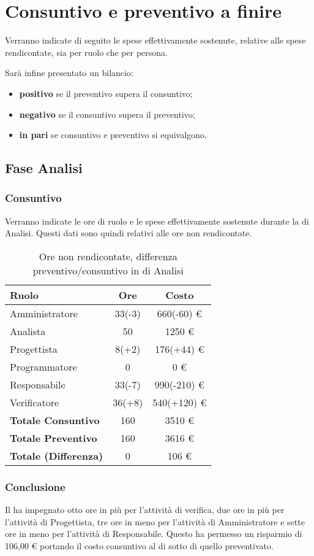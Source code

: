 \section{Consuntivo e preventivo a finire}
Verranno indicate di seguito le spese effettivamente sostenute, relative alle spese rendicontate, sia per ruolo che per persona.

Sar\`a infine presentato un bilancio:
\begin{itemize}
\item \textbf{positivo} se il preventivo supera il consuntivo;
\item \textbf{negativo} se il consuntivo supera il preventivo;
\item \textbf{in pari} se consuntivo e preventivo si equivalgono.
\end{itemize}


\subsection{Fase Analisi}
\subsubsection{Consuntivo}
Verranno indicate le ore di ruolo e le spese effettivamente sostenute durante la  di Analisi. Questi dati sono quindi relativi alle ore non rendicontate.

\begin{table}[H]
	\centering
	\begin{tabular}{ l c c }
		\textbf{Ruolo} & \textbf{Ore} & \textbf{Costo} \\
		\hline
		Amministratore & 33(-3) & 660(-60) \euro{} \\
		Analista & 50 & 1250 \euro{} \\
		Progettista & 8(+2) & 176(+44) \euro{} \\
		Programmatore & 0 & 0 \euro{} \\
		Responsabile & 33(-7) & 990(-210) \euro{} \\
		Verificatore & 36(+8) & 540(+120) \euro{} \\
		\hline
		\textbf{Totale Consuntivo} & 160 & 3510 \euro{} \\
		\hline
		\textbf{Totale Preventivo} & 160 & 3616 \euro{} \\
		\hline
		\textbf{Totale (Differenza)} & 0 & 106 \euro{} \\
		\hline
	\end{tabular}
	\caption{Ore non rendicontate, differenza preventivo/consuntivo in  di Analisi}
\end{table}



\subsubsection{Conclusione}
Il  ha impegnato otto ore in pi\`u per l'attivit\`a di verifica, due ore in pi\`u per l'attivit\`a di Progettista, tre ore in meno per l'attivit\`a di Amministratore e sette ore in meno per l'attivit\`a di Responsabile. Questo ha permesso un risparmio di 106,00 \euro{} portando il costo consuntivo al di sotto di quello preventivato.
